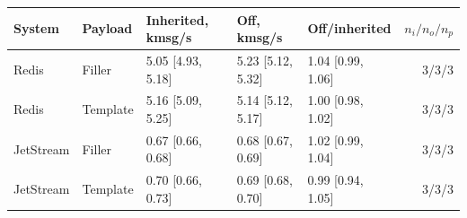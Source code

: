 \begin{tabular}{lllllr}
\toprule
System & Payload & Inherited, kmsg/s & Off, kmsg/s & Off/inherited & $n_i/n_o/n_p$\\
\midrule
Redis & Filler & 5.05 [4.93, 5.18] & 5.23 [5.12, 5.32] & 1.04 [0.99, 1.06] & 3/3/3\\
Redis & Template & 5.16 [5.09, 5.25] & 5.14 [5.12, 5.17] & 1.00 [0.98, 1.02] & 3/3/3\\
JetStream & Filler & 0.67 [0.66, 0.68] & 0.68 [0.67, 0.69] & 1.02 [0.99, 1.04] & 3/3/3\\
JetStream & Template & 0.70 [0.66, 0.73] & 0.69 [0.68, 0.70] & 0.99 [0.94, 1.05] & 3/3/3\\
\bottomrule
\end{tabular}
